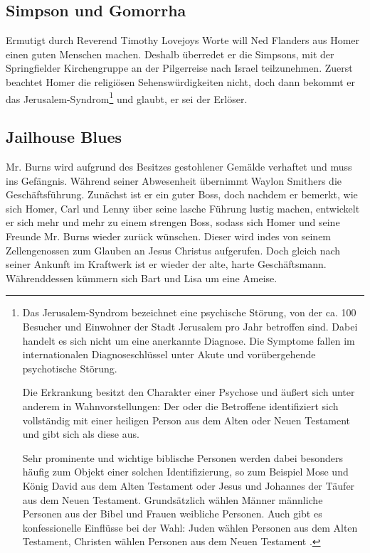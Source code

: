 \subsection{Simpson und Gomorrha}
Ermutigt durch Reverend Timothy Lovejoys Worte will Ned Flanders aus Homer einen guten Menschen machen. Deshalb überredet er die Simpsons, mit der Springfielder Kirchengruppe an der Pilgerreise nach Israel teilzunehmen. Zuerst beachtet Homer die religiösen Sehenswürdig\-kei\-ten nicht, doch dann bekommt er das Jerusalem-Syndrom\footnote{Das Jerusalem-Syndrom bezeichnet eine psychische Störung, von der ca. 100 Besucher und Einwohner der Stadt Jerusalem pro Jahr betroffen sind. Dabei handelt es sich nicht um eine anerkannte Diagnose. Die Symptome fallen im internationalen Diagnoseschlüssel unter \glqq Akute und vorübergehende psychotische Störung\grqq .

Die Erkrankung besitzt den Charakter einer Psychose und äußert sich unter anderem in Wahnvorstellungen: Der oder die Betroffene identifiziert sich vollständig mit einer heiligen Person aus dem Alten oder Neuen Testament und gibt sich als diese aus.

Sehr prominente und wichtige biblische Personen werden dabei besonders häufig zum Objekt einer solchen Identifizierung, so zum Beispiel Mose und König David aus dem Alten Testament oder Jesus und Johannes der Täufer aus dem Neuen Testament. Grundsätzlich wählen Männer männliche Personen aus der Bibel und Frauen weibliche Personen. Auch gibt es konfessionelle Einflüsse bei der Wahl: Juden wählen Personen aus dem Alten Testament, Christen wählen Personen aus dem Neuen Testament \cite{JerusalemSyndrom}.} und glaubt, er sei der Erlöser. 



\subsection{Jailhouse Blues}\label{MABF08}
Mr. Burns wird aufgrund des Besitzes gestohlener Gemälde verhaftet und muss ins Gefängnis. Während seiner Abwesenheit übernimmt Waylon Smithers die Geschäftsführung. Zunächst ist er ein guter Boss, doch nachdem er bemerkt, wie sich Homer, Carl und Lenny über seine lasche Führung lustig machen, entwickelt er sich mehr und mehr zu einem strengen Boss, sodass sich Homer und seine Freunde Mr. Burns wieder zurück wünschen. Dieser wird indes von seinem Zellengenossen zum Glauben an Jesus Christus aufgerufen. Doch gleich nach seiner Ankunft im Kraftwerk ist er wieder der alte, harte Geschäftsmann. Währenddessen kümmern sich Bart und Lisa um eine Ameise. 

